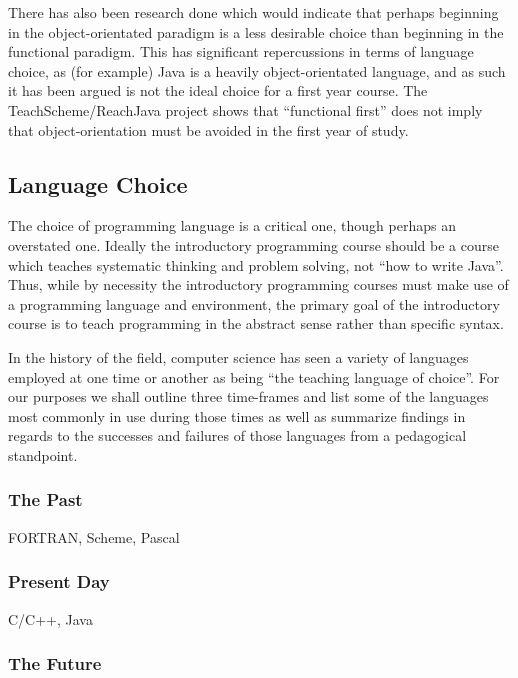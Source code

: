There has also been research done which would indicate that perhaps beginning in the object-orientated paradigm is a less desirable choice than beginning in the functional paradigm\cite{Flatt04,Huch05}.  This has significant repercussions in terms of language choice, as (for example) Java is a heavily object-orientated language, and as such it has been argued is not the ideal choice for a first year course\cite{Bos98,Huch05}.  The TeachScheme/ReachJava project shows that ``functional first'' does not imply that object-orientation must be avoided in the first year of study\cite{Bloch08,teachScheme,Felleisen04}.


\subsection{Language Choice}

The choice of programming language is a critical one, though perhaps an overstated one.  Ideally the introductory programming course should be a course which teaches systematic thinking and problem solving, not ``how to write Java''.  Thus, while by necessity the introductory programming courses must make use of a programming language and environment, the primary goal of the introductory course is to teach programming in the abstract sense rather than specific syntax.

In the history of the field, computer science has seen a variety of languages employed at one time or another as being ``the teaching language of choice''.  For our purposes we shall outline three time-frames and list some of the languages most commonly in use during those times as well as summarize findings in regards to the successes and failures of those languages from a pedagogical standpoint.

\subsubsection{The Past}

FORTRAN, Scheme, Pascal

\subsubsection{Present Day}

C/C++, Java

\subsubsection{The Future}

